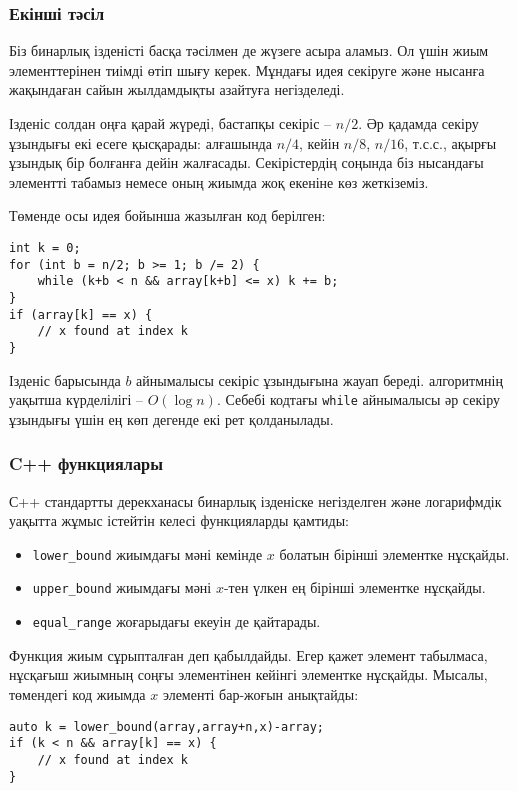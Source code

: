 \subsubsection{Екінші тәсіл}

Біз бинарлық ізденісті басқа тәсілмен де жүзеге асыра аламыз. Ол үшін жиым элементтерінен тиімді өтіп шығу керек. Мұндағы идея секіруге және нысанға
жақындаған сайын жылдамдықты азайтуға негізделеді.

Ізденіс солдан оңға қарай жүреді, бастапқы секіріс --
$n/2$. Әр қадамда секіру ұзындығы екі есеге қысқарады:
алғашында $n/4$, кейін $n/8$, $n/16$, т.с.с., ақырғы 
ұзындық бір болғанға дейін жалғасады.
Секірістердің соңында біз нысандағы элементті табамыз
немесе оның жиымда жоқ екеніне көз жеткіземіз.
\newpage

Төменде осы идея бойынша жазылған код берілген:
\begin{lstlisting}
int k = 0;
for (int b = n/2; b >= 1; b /= 2) {
    while (k+b < n && array[k+b] <= x) k += b;
}
if (array[k] == x) {
    // x found at index k
}
\end{lstlisting}

Ізденіс барысында $b$ айнымалысы
секіріс ұзындығына жауап береді.
алгоритмнің уақытша күрделілігі -- $O(\log n)$.
Себебі кодтағы \texttt{while} айнымалысы
әр секіру ұзындығы үшін ең көп дегенде екі
рет қолданылады.

\subsubsection{C++ функциялары}

С++ стандартты дерекханасы бинарлық ізденіске 
негізделген және логарифмдік уақытта жұмыс істейтін
келесі функцияларды қамтиды:

\begin{itemize}
\item \texttt{lower\_bound} жиымдағы мәні кемінде $x$ болатын
бірінші элементке нұсқайды.
\item \texttt{upper\_bound} жиымдағы мәні $x$-тен үлкен ең
бірінші элементке нұсқайды.
\item \texttt{equal\_range} жоғарыдағы екеуін де қайтарады.
\end{itemize}

Функция жиым сұрыпталған деп қабылдайды.
Егер қажет элемент табылмаса, нұсқағыш жиымның соңғы
элементінен кейінгі элементке нұсқайды. 
Мысалы, төмендегі код жиымда $x$ элементі бар-жоғын анықтайды:

\begin{lstlisting}
auto k = lower_bound(array,array+n,x)-array;
if (k < n && array[k] == x) {
    // x found at index k
}
\end{lstlisting}


